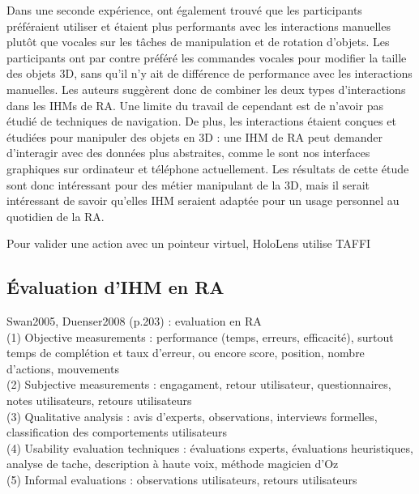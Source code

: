 
Dans une seconde expérience, \citeauthor{Piumsomboon2014} ont également trouvé que les participants préféraient utiliser et étaient plus performants avec les interactions manuelles plutôt que vocales sur les tâches de manipulation et de rotation d'objets. Les participants ont par contre préféré les commandes vocales pour modifier la taille des objets 3D, sans qu'il n'y ait de différence de performance avec les interactions manuelles. Les auteurs suggèrent donc de combiner les deux types d'interactions dans les IHMs de RA. Une limite du travail de \citeauthor{Piumsomboon2014} cependant est de n'avoir pas étudié de techniques de navigation. De plus, les interactions étaient conçues et étudiées pour manipuler des objets en 3D : une IHM de RA peut demander d'interagir avec des données plus abstraites, comme le sont nos interfaces graphiques sur ordinateur et téléphone actuellement. Les résultats de cette étude sont donc intéressant pour des métier manipulant de la 3D, mais il serait intéressant de savoir qu'elles IHM seraient adaptée pour un usage personnel au quotidien de la RA.


Pour valider une action avec un pointeur virtuel, HoloLens utilise TAFFI \cite{Wilson2006}

\subsection{Évaluation d'IHM en RA}
Swan2005, Duenser2008 (p.203) : evaluation en RA\\
(1) Objective measurements : performance (temps, erreurs, efficacité), surtout temps de complétion et taux d'erreur, ou encore score, position, nombre d'actions, mouvements\\
(2) Subjective measurements : engagament, retour utilisateur, questionnaires, notes utilisateurs, retours utilisateurs\\
(3) Qualitative analysis : avis d'experts, observations, interviews formelles, classification des comportements utilisateurs\\
(4) Usability evaluation techniques : évaluations experts, évaluations heuristiques, analyse de tache, description à haute voix, méthode magicien d'Oz\\
(5) Informal evaluations : observations utilisateurs, retours utilisateurs

